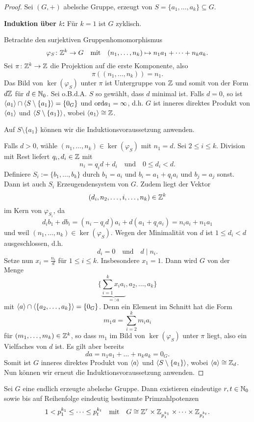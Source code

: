 \begin{proof}
	Sei $(G, +)$ abelsche Gruppe, erzeugt von $S = \{a_1, \dots, a_k\} \subseteq G$. 
	
	\textbf{Induktion über $k$:} Für $k = 1$ ist $G$ zyklisch.
	
	Betrachte den surjektiven Gruppenhomomorphismus
	\[\varphi_S \colon \mathbb{Z}^k \to G \quad\text{mit}\quad(n_1, \dots, n_k) \mapsto n_1a_1 + \dots + n_ka_k.\]
	Sei $\pi \colon \mathbb{Z}^k \to \mathbb{Z}$ die Projektion auf die erste Komponente, also
	\[\pi((n_1, \dots, n_k)) = n_1.\]
	Das Bild von $\ker(\varphi_S)$ unter $\pi$ ist Untergruppe von $\mathbb{Z}$ und somit von der Form $d\mathbb{Z}$ für $d \in \mathbb{N}_0$. Sei o.B.d.A. $S$ so gewählt, dass $d$ minimal ist. Falls $d = 0$, so ist $\langle a_1 \rangle \cap \langle S\setminus\{a_1\} \rangle= \{0_G\}$ und $\mathrm{ord}{a_1} = \infty$, d.h. $G$ ist inneres direktes Produkt von $\langle a_1 \rangle$ und $\langle S\setminus\{a_1\} \rangle$, wobei $\langle a_1 \rangle \cong \mathbb{Z}$.
	
	Auf $S\setminus\{a_1\}$ können wir die Induktionsvoraussetzung anwenden. 
	
	Falls $d > 0$, wähle $(n_1, \dots, n_k) \in \ker(\varphi_S)$ mit $n_1 = d$. Sei $2 \leq i \leq k$. Division mit Rest liefert $q_i, d_i \in \mathbb{Z}$ mit
	\[n_i = q_i d + d_i \quad\text{und}\quad 0 \leq d_i < d.\]
	Definiere $S_i := \{b_1, \dots, b_k\}$ durch $b_1 = a_i$ und $b_i = a_1 + q_i a_i$ und $b_j = a_j$ sonst. Dann ist auch $S_i$ Erzeugendensystem von $G$. Zudem liegt der Vektor
	\[(d_i, n_2, \dots, i, \dots, n_k) \in \mathbb{Z}^k\]
	im Kern von $\varphi_{S_i}$, da
	\[d_ib_1 + db_i = (n_i - q_id)a_i + d(a_1 + q_ia_i) = n_ia_i + n_1a_1\]
	und weil $(n_1, \dots, n_k) \in \ker(\varphi_S)$. Wegen der Minimalität von $d$ ist $1 \leq d_i < d$ ausgeschlossen, d.h.
	\[d_i = 0 \quad\text{und}\quad d \mid n_i.\]
	Setze nun $x_i = \frac{n_i}{d}$ für $1 \leq i \leq k$. Insbesondere $x_1 = 1$. Dann wird $G$ von der Menge
	\[\bigg\{\underbrace{\sum_{i=1}^k x_ia_i}_{=: a} , a_2, \dots, a_k\bigg\}\]
	mit $\langle a \rangle \cap \langle \{a_2, \dots, a_k\} \rangle = \{0_G\}$. Denn ein Element im Schnitt hat die Form 
	\[m_1a = \sum_{i=2}^k m_ia_i\]
	für $(m_1, \dots, m_k) \in \mathbb{Z}^k$, so dass $m_1$ im Bild von $\ker(\varphi_S)$ unter $\pi$ liegt, also ein Vielfaches von $d$ ist. Es gilt aber bereits
	\[da = n_1 a_1 + \dots + n_ka_k = 0_G.\]
	Somit ist $G$ inneres direktes Produkt von $\langle a \rangle$ und $\langle S \setminus \{a_1\} \rangle$, wobei  $\langle a \rangle \cong \mathbb{Z}_d$. Nun können wir erneut die Induktionsvoraussetzung anwenden.
\end{proof}
\begin{kor}\label{kor2_12}
	Sei $G$ eine endlich erzeugte abelsche Gruppe. Dann existieren eindeutige $r,t \in \mathbb{N}_0$ sowie bis auf Reihenfolge eindeutig bestimmte Primzahlpotenzen 
	\[1 < p_1^{k_1} \leq \dots \leq p_t^{k_t} \quad\text{mit}\quad G \cong \mathbb{Z}^r \times \mathbb{Z}_{p_1^{k_1}} \times \dots \times \mathbb{Z}_{p_t^{k_t}}.\]
\end{kor}
